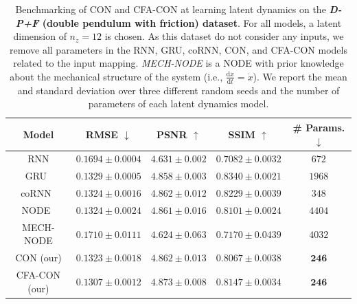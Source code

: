 \begin{table}[ht]
    \centering
    \begin{scriptsize}
    \begin{tabular}{c c c c c}
         \toprule
         \textbf{Model} & \textbf{RMSE} $\downarrow$ & \textbf{PSNR} $\uparrow$ & \textbf{SSIM} $\uparrow$ & \textbf{\# Params.} $\downarrow$ \\
         \midrule
         RNN & $0.1694 \pm 0.0004$ & $4.631 \pm 0.002$ & $0.7082 \pm 0.0032$ & $672$\\
         GRU~\citep{cho2014learning} & $0.1329 \pm 0.0005$ & $4.858 \pm 0.003$ & $\mathbf{0.8340 \pm 0.0021}$ & $1968$\\
         coRNN~\citep{rusch2020coupled} & $0.1324 \pm 0.0016$ & $4.862 \pm 0.012$ & $0.8229 \pm 0.0039$ & $348$\\
         NODE~\citep{chen2018neural} & $0.1324 \pm 0.0024$ & $4.861 \pm 0.016$ & $0.8101 \pm 0.0024$ & $4404$\\
         MECH-NODE & $0.1710 \pm 0.0111$ & $4.624 \pm 0.063$ & $0.7170 \pm 0.0439$ & $4032$\\
         CON (our) & $0.1323 \pm 0.0018$ & $4.862 \pm 0.013$ & $0.8067 \pm 0.0038$ & $\mathbf{246}$\\
         CFA-CON (our) & $\mathbf{0.1307 \pm 0.0012}$ & $\mathbf{4.873 \pm 0.008}$ & $0.8147 \pm 0.0034$ & $\mathbf{246}$\\
         \bottomrule
    \end{tabular}
    \end{scriptsize}
    \vspace{0.5cm}
    \caption{Benchmarking of \gls{CON} and \gls{CFA-CON} at learning latent dynamics on the \textbf{\emph{D-P+F} (double pendulum with friction) dataset}. For all models, a latent dimension of $n_z=12$ is chosen. 
    As this dataset do not consider any inputs, we remove all parameters in the RNN, GRU, coRNN, CON, and CFA-CON models related to the input mapping.
    \emph{MECH-NODE} is a \gls{NODE} with prior knowledge about the mechanical structure of the system (i.e., $\frac{\mathrm{d}x}{\mathrm{d}t} = \dot{x}$). We report the mean and standard deviation over three different random seeds and the number of parameters of each latent dynamics model.
    }
    \label{tab:apx-con:latent_dynamics_results:d_p_f}
\end{table}

